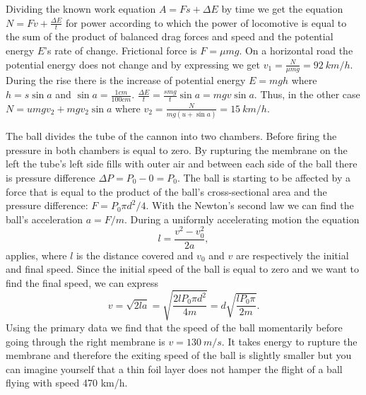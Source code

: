 \documentclass[11pt]{article}
\begin{document}

\solueng
Dividing the known work equation $A=Fs+\Delta E$ by time we get the equation $N=Fv+\frac{\Delta E}{t}$ for power according to which the power of locomotive is equal to the sum of the product of balanced drag forces and speed and the potential energy $E$’s rate of change. Frictional force is $F=\mu mg$. On a horizontal road the potential energy does not change and by expressing we get $v_1=\frac{N}{\mu mg}=\SI{92}{km \per h}$. During the rise there is the increase of potential energy $E=mgh$ where $h=s\sin a$ and $\sin a= \frac{1cm}{100cm}$. $\frac{\Delta E}{t}=\frac{smg}{t}\sin a=mgv\sin a$. Thus, in the other case $N=umgv_2+mgv_2\sin a$ where $v_2=\frac{N}{mg(u+\sin a)}=\SI{15}{km \per h}$.
\probend
\bigskip


\solueng
The ball divides the tube of the cannon into two chambers. Before firing the pressure in both chambers is equal to zero. By rupturing the membrane on the left the tube’s left side fills with outer air and between each side of the ball there is pressure difference $\Delta P=P_0-0=P_0$. The ball is starting to be affected by a force that is equal to the product of the ball’s cross-sectional area and the pressure difference: $F=P_0\pi d^2/4$. With the Newton’s second law we can find the ball’s acceleration $a=F/m$. During a uniformly accelerating motion the equation 
\[ l=\frac{v^2-v_0^2}{2a}, \] 
applies, where $l$ is the distance covered and $v_0$ and $v$ are respectively the initial and final speed. Since the initial speed of the ball is equal to zero and we want to find the final speed, we can express 
\[ v=\sqrt{2la}=\sqrt{\frac{2lP_0\pi d^2}{4m}}=d\sqrt{\frac{lP_0\pi}{2m}}.\] 
Using the primary data we find that the speed of the ball momentarily before going through the right membrane is $v=\SI{130}{m/s}$. It takes energy to rupture the membrane and therefore the exiting speed of the ball is slightly smaller but you can imagine yourself that a thin foil layer does not hamper the flight of a ball flying with speed 470 km/h.
\probend
\bigskip

\end{document}
